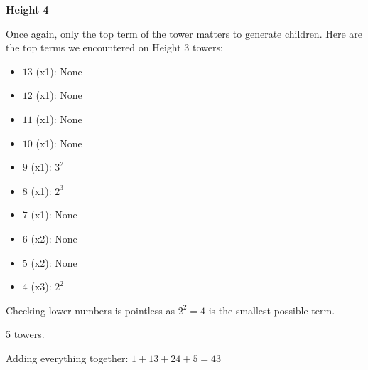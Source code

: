 \begin{enumerate}
 
\textbf{Height 4}

 Once again, only the top term of the tower matters to generate children. Here are the top terms we encountered on Height 3 towers:

 
            \begin{itemize}
        \item $13$ (x1): None
        \item $12$ (x1): None
        \item $11$ (x1): None
        \item $10$ (x1): None
        \item $9$ (x1): $3^2$
        \item $8$ (x1): $2^3$
        \item $7$ (x1): None
        \item $6$ (x2): None
        \item $5$ (x2): None
        \item $4$ (x3): $2^2$
            \end{itemize}
            Checking lower numbers is pointless as $2^2=4$ is the smallest possible term.

 5 towers.

 
Adding everything together: $1+13+24+5=\boxed{43}$



\end{enumerate}